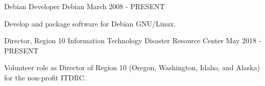 
\begin{cventries}
  \cventry
    {Debian Developer} %
    {Debian} %
    {}
    {March 2008 - PRESENT} %
    {
      \begin{cvitems} %
        {Develop and package software for Debian GNU/Linux.}
      \end{cvitems}
    }

  \cventry
    {Director, Region 10} %
    {Information Technology Disaster Resource Center} %
    {}
    {May 2018 - PRESENT} %
    {
      \begin{cvitems} %
        {Volunteer role as Director of Region 10 (Oregon, Washington, Idaho, and Alaska) for the non-profit ITDRC.}
      \end{cvitems}
    }
\end{cventries}
